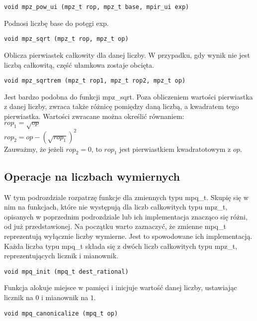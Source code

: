 \documentclass[twoside,a4paper]{book}
\begin{document}
\begin{lstlisting}
void mpz_pow_ui (mpz_t rop, mpz_t base, mpir_ui exp)
\end{lstlisting}

Podnosi liczbę base do potęgi exp.

\begin{lstlisting}
void mpz_sqrt (mpz_t rop, mpz_t op)
\end{lstlisting}

Oblicza pierwiastek całkowity dla danej liczby. W przypadku, gdy wynik nie jest liczbą całkowitą, część ułamkowa zostaje obcięta.

\begin{lstlisting}
void mpz_sqrtrem (mpz_t rop1, mpz_t rop2, mpz_t op)
\end{lstlisting}

Jest bardzo podobna do funkcji mpz\_sqrt. Poza obliczeniem wartości pierwiastka z danej liczby, zwraca także różnicę pomiędzy daną liczbą, a kwadratem tego pierwiastka. Wartości zwracane można określić równaniem: \\
$rop_1 = \sqrt{op}$ \\
$rop_2 = op - (\sqrt{rop_1})^2$ \\
Zauważmy, że jeżeli $rop_2=0$, to $rop_1$ jest pierwiastkiem kwadratotowym z $op$.

\subsection{Operacje na liczbach wymiernych}

W tym podrozdziale rozpatrzę funkcje dla zmiennych typu mpq\_t. Skupię się w nim na funkcjach, które nie występują dla liczb całkowitych typu mpz\_t, opisanych w poprzednim podrozdziale lub ich implementacja znacząco się różni, od już przedstawionej.
Na początku warto zaznaczyć, że zmienne mpq\_t reprezentują wyłącznie liczby wymierne. Jest to spowodowane ich implementacją. Każda liczba typu mpq\_t składa się z dwóch liczb całkowitych typu mpz\_t, reprezentujących licznik i mianownik.

\begin{lstlisting}
void mpq_init (mpq_t dest_rational)
\end{lstlisting}

Funkcja alokuje miejsce w pamięci i inicjuje wartość danej liczby, ustawiając licznik na $0$ i mianownik na $1$.

\begin{lstlisting}
void mpq_canonicalize (mpq_t op)
\end{lstlisting}
\end{document}
